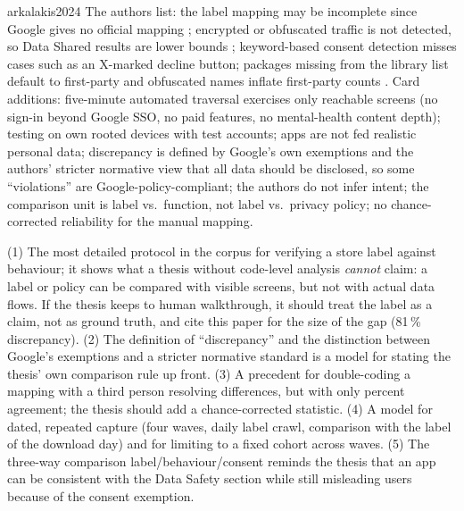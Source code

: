 \begin{papercard}{arkalakis2024}
 The authors list: the label mapping may be incomplete since Google gives no official mapping ; encrypted or obfuscated traffic is not detected, so Data Shared results are lower bounds ; keyword-based consent detection misses cases such as an X-marked decline button; packages missing from the library list default to first-party and obfuscated names inflate first-party counts . Card additions: five-minute automated traversal exercises only reachable screens (no sign-in beyond Google SSO, no paid features, no mental-health content depth); testing on own rooted devices with test accounts; apps are not fed realistic personal data; discrepancy is defined by Google's own exemptions and the authors' stricter normative view that all data should be disclosed, so some ``violations'' are Google-policy-compliant; the authors do not infer intent; the comparison unit is label vs.\ function, not label vs.\ privacy policy; no chance-corrected reliability for the manual mapping.

 (1) The most detailed protocol in the corpus for verifying a store label against behaviour; it shows what a thesis without code-level analysis \emph{cannot} claim: a label or policy can be compared with visible screens, but not with actual data flows. If the thesis keeps to human walkthrough, it should treat the label as a claim, not as ground truth, and cite this paper for the size of the gap (81\,\% discrepancy). (2) The definition of ``discrepancy'' and the distinction between Google's exemptions and a stricter normative standard is a model for stating the thesis' own comparison rule up front. (3) A precedent for double-coding a mapping with a third person resolving differences, but with only percent agreement; the thesis should add a chance-corrected statistic. (4) A model for dated, repeated capture (four waves, daily label crawl, comparison with the label of the download day) and for limiting to a fixed cohort across waves. (5) The three-way comparison label/behaviour/consent reminds the thesis that an app can be consistent with the Data Safety section while still misleading users because of the consent exemption.
\end{papercard}
